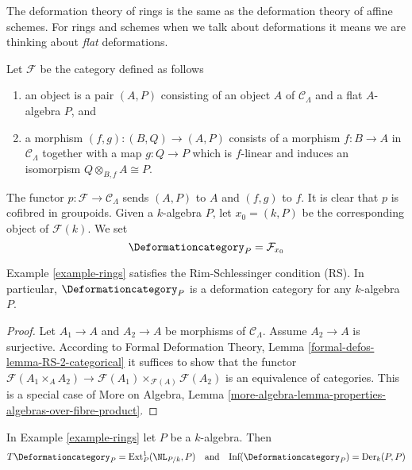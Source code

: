 \noindent
The deformation theory of rings is the same as the deformation theory
of affine schemes. For rings and schemes when we talk about deformations
it means we are thinking about {\it flat} deformations.

\begin{example}[Rings]
\label{example-rings}
Let $\mathcal{F}$ be the category defined as follows
\begin{enumerate}
\item an object is a pair $(A, P)$ consisting of an
object $A$ of $\mathcal{C}_\Lambda$ and a flat $A$-algebra $P$, and
\item a morphism $(f, g) : (B, Q) \to (A, P)$ consists of
a morphism $f : B \to A$ in $\mathcal{C}_\Lambda$ together
with a map $g : Q \to P$ which is $f$-linear and induces an
isomorpism $Q \otimes_{B, f} A \cong P$.
\end{enumerate}
The functor $p : \mathcal{F} \to \mathcal{C}_\Lambda$ sends $(A, P)$
to $A$ and $(f, g)$ to $f$. It is clear that $p$ is cofibred in groupoids.
Given a $k$-algebra $P$, let $x_0 = (k, P)$ be the corresponding object
of $\mathcal{F}(k)$. We set
$$
\Deformationcategory_P = \mathcal{F}_{x_0}
$$
\end{example}

\begin{lemma}
\label{lemma-rings-RS}
Example \ref{example-rings}
satisfies the Rim-Schlessinger condition (RS).
In particular, $\Deformationcategory_P$ is a deformation category
for any $k$-algebra $P$.
\end{lemma}

\begin{proof}
Let $A_1 \to A$ and $A_2 \to A$ be morphisms of $\mathcal{C}_\Lambda$.
Assume $A_2 \to A$ is surjective. According to
Formal Deformation Theory, Lemma
\ref{formal-defos-lemma-RS-2-categorical}
it suffices to show that the functor
$\mathcal{F}(A_1 \times_A A_2) \to
\mathcal{F}(A_1) \times_{\mathcal{F}(A)} \mathcal{F}(A_2)$
is an equivalence of categories.
This is a special case of More on Algebra, Lemma
\ref{more-algebra-lemma-properties-algebras-over-fibre-product}.
\end{proof}

\begin{lemma}
\label{lemma-rings-TI}
In Example \ref{example-rings} let $P$ be a $k$-algebra. Then
$$
T\Deformationcategory_P = \text{Ext}^1_P(\NL_{P/k}, P)
\quad\text{and}\quad
\text{Inf}(\Deformationcategory_P) = \text{Der}_k(P, P)
$$
\end{lemma}


